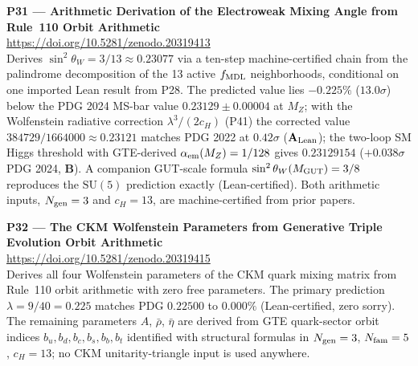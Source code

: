 \documentclass[11pt]{article}
\newcommand{\CatAL}{\ensuremath{\textbf{A}_{\rm Lean}}}
\newcommand{\CatB}{\textbf{B}}
\begin{document}
\medskip
\noindent\textbf{P31 — Arithmetic Derivation of the Electroweak Mixing Angle
from Rule~110 Orbit Arithmetic}~\cite{SpivackWeinberg}\\
\url{https://doi.org/10.5281/zenodo.20319413}\\
Derives $\sin^2\theta_W = 3/13 \approx 0.23077$ via a ten-step machine-certified
chain from the palindrome decomposition of the 13 active $f_{\rm MDL}$ neighborhoods,
conditional on one imported Lean result from P28.  The predicted value lies
$-0.225\%$ ($13.0\sigma$) below the PDG 2024 MS-bar value $0.23129 \pm 0.00004$ at $M_Z$;
with the Wolfenstein radiative correction $\lambda^3/(2c_H)$ (P41) the corrected
value $384729/1664000 \approx 0.23121$ matches PDG 2022 at $0.42\sigma$ (\CatAL);
the two-loop SM Higgs threshold with GTE-derived $\alpha_{\rm em}(M_Z) = 1/128$
gives $0.23129154$ ($+0.038\sigma$ PDG 2024, \CatB).  A companion
GUT-scale formula $\sin^2\theta_W(M_{\rm GUT}) = 3/8$ reproduces the
$\mathrm{SU}(5)$ prediction exactly (Lean-certified).  Both arithmetic inputs,
$N_{\rm gen}=3$ and $c_H=13$, are machine-certified from prior papers.

\medskip
\noindent\textbf{P32 — The CKM Wolfenstein Parameters from Generative Triple
Evolution Orbit Arithmetic}~\cite{SpivackCKM}\\
\url{https://doi.org/10.5281/zenodo.20319415}\\
Derives all four Wolfenstein parameters of the CKM quark mixing matrix from
Rule~110 orbit arithmetic with zero free parameters.  The primary prediction
$\lambda = 9/40 = 0.225$ matches PDG $0.22500$ to $0.000\%$ (Lean-certified,
zero sorry).  The remaining parameters $A$, $\bar\rho$, $\bar\eta$ are derived
from GTE quark-sector orbit indices $b_u, b_d, b_c, b_s, b_b, b_t$ identified
with structural formulas in $N_{\rm gen} = 3$, $N_{\rm fam} = 5$, $c_H = 13$;
no CKM unitarity-triangle input is used anywhere.
\end{document}

